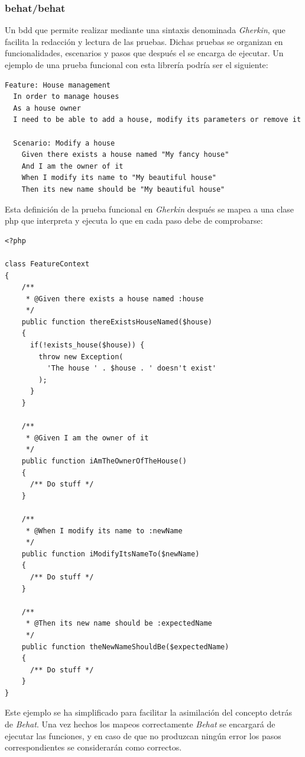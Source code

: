 \subsubsection{behat/behat}
\label{sec:tech:behat}
Un  \gls{bdd} que permite realizar
 mediante una sintaxis denominada
\textit{Gherkin}, que facilita la redacción y lectura de las pruebas.
Dichas pruebas se organizan en funcionalidades, escenarios y pasos que después
el  se encarga de ejecutar. Un ejemplo de una
prueba funcional con esta librería podría ser el siguiente:

\begin{verbatim}
Feature: House management
  In order to manage houses
  As a house owner
  I need to be able to add a house, modify its parameters or remove it

  Scenario: Modify a house
    Given there exists a house named "My fancy house"
    And I am the owner of it
    When I modify its name to "My beautiful house"
    Then its new name should be "My beautiful house"
\end{verbatim}

Esta definición de la prueba funcional en \textit{Gherkin} después se mapea a
una clase \gls{php} que interpreta y ejecuta lo que en cada paso debe de
comprobarse:

\begin{verbatim}
<?php

class FeatureContext
{
    /**
     * @Given there exists a house named :house
     */
    public function thereExistsHouseNamed($house)
    {
      if(!exists_house($house)) {
        throw new Exception(
          'The house ' . $house . ' doesn't exist'
        );
      }
    }

    /**
     * @Given I am the owner of it
     */
    public function iAmTheOwnerOfTheHouse()
    {
      /** Do stuff */
    }

    /**
     * @When I modify its name to :newName
     */
    public function iModifyItsNameTo($newName)
    {
      /** Do stuff */
    }

    /**
     * @Then its new name should be :expectedName
     */
    public function theNewNameShouldBe($expectedName)
    {
      /** Do stuff */
    }
}
\end{verbatim}
Este ejemplo se ha simplificado para facilitar la asimilación del concepto
detrás de \textit{Behat}. Una vez hechos los mapeos correctamente
\textit{Behat} se encargará de ejecutar las funciones, y en caso de que no
produzcan ningún error los pasos correspondientes se considerarán como
correctos.

